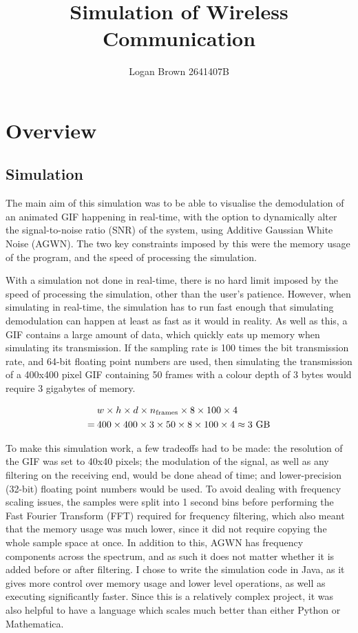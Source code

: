 \documentclass{article}
\title{Simulation of Wireless Communication}
\author{Logan Brown 2641407B}
\begin{document}
\maketitle
\section{Overview}
\subsection{Simulation}
The main aim of this simulation was to be able to visualise the demodulation of an animated GIF happening in real-time, with the option to dynamically alter the signal-to-noise ratio (SNR) of the system, using Additive Gaussian White Noise (AGWN). The two key constraints imposed by this were the memory usage of the program, and the speed of processing the simulation.

With a simulation not done in real-time, there is no hard limit imposed by the speed of processing the simulation, other than the user's patience. However, when simulating in real-time, the simulation has to run fast enough that simulating demodulation can happen at least as fast as it would in reality.
As well as this, a GIF contains a large amount of data, which quickly eats up memory when simulating its transmission. If the sampling rate is 100 times the bit transmission rate, and 64-bit floating point numbers are used, then simulating the transmission of a 400x400 pixel GIF containing 50 frames with a colour depth of 3 bytes would require 3 gigabytes of memory.

\begin{equation}
    \begin{aligned}
             & w \times h \times d \times n_{\text{frames}} \times 8 \times 100 \times 4                  \\
        = \: & 400 \times 400 \times 3 \times 50 \times 8 \times 100 \times 4 \approx 3 \text{ GB} \notag
    \end{aligned}
\end{equation}

To make this simulation work, a few tradeoffs had to be made: the resolution of the GIF was set to 40x40 pixels; the modulation of the signal, as well as any filtering on the receiving end, would be done ahead of time; and lower-precision (32-bit) floating point numbers would be used. To avoid dealing with frequency scaling issues, the samples were split into 1 second bins before performing the Fast Fourier Transform (FFT) required for frequency filtering, which also meant that the memory usage was much lower, since it did not require copying the whole sample space at once. In addition to this, AGWN has frequency components across the spectrum, and as such it does not matter whether it is added before or after filtering. I chose to write the simulation code in Java, as it gives more control over memory usage and lower level operations, as well as executing significantly faster. Since this is a relatively complex project, it was also helpful to have a language which scales much better than either Python or Mathematica.
\end{document}
